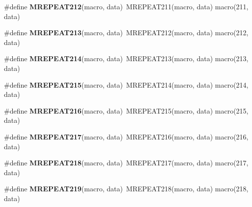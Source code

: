 \begin{DoxyCompactItemize}
\item 
\hypertarget{group__group__sam0__utils__mrepeat_gad82f46aaf9a5b824c91394754824d66d}{}\#define {\bfseries M\+R\+E\+P\+E\+A\+T212}(macro,  data)~M\+R\+E\+P\+E\+A\+T211(macro, data)   macro(211, data)\label{group__group__sam0__utils__mrepeat_gad82f46aaf9a5b824c91394754824d66d}

\item 
\hypertarget{group__group__sam0__utils__mrepeat_gaccb21a4853dfcaf0709211bfb7bd8671}{}\#define {\bfseries M\+R\+E\+P\+E\+A\+T213}(macro,  data)~M\+R\+E\+P\+E\+A\+T212(macro, data)   macro(212, data)\label{group__group__sam0__utils__mrepeat_gaccb21a4853dfcaf0709211bfb7bd8671}

\item 
\hypertarget{group__group__sam0__utils__mrepeat_ga7dc8e4f802d149970b11ab09ee582aca}{}\#define {\bfseries M\+R\+E\+P\+E\+A\+T214}(macro,  data)~M\+R\+E\+P\+E\+A\+T213(macro, data)   macro(213, data)\label{group__group__sam0__utils__mrepeat_ga7dc8e4f802d149970b11ab09ee582aca}

\item 
\hypertarget{group__group__sam0__utils__mrepeat_gae2a73793b6f0682b5b209181a2cce5c3}{}\#define {\bfseries M\+R\+E\+P\+E\+A\+T215}(macro,  data)~M\+R\+E\+P\+E\+A\+T214(macro, data)   macro(214, data)\label{group__group__sam0__utils__mrepeat_gae2a73793b6f0682b5b209181a2cce5c3}

\item 
\hypertarget{group__group__sam0__utils__mrepeat_gab9f89f1489a59ce0b2fdaf9c5a1eb04b}{}\#define {\bfseries M\+R\+E\+P\+E\+A\+T216}(macro,  data)~M\+R\+E\+P\+E\+A\+T215(macro, data)   macro(215, data)\label{group__group__sam0__utils__mrepeat_gab9f89f1489a59ce0b2fdaf9c5a1eb04b}

\item 
\hypertarget{group__group__sam0__utils__mrepeat_gac3e3763cfaa790bd77c54a125a5342ba}{}\#define {\bfseries M\+R\+E\+P\+E\+A\+T217}(macro,  data)~M\+R\+E\+P\+E\+A\+T216(macro, data)   macro(216, data)\label{group__group__sam0__utils__mrepeat_gac3e3763cfaa790bd77c54a125a5342ba}

\item 
\hypertarget{group__group__sam0__utils__mrepeat_ga35dba4e312bc00bcfcbf099981b01206}{}\#define {\bfseries M\+R\+E\+P\+E\+A\+T218}(macro,  data)~M\+R\+E\+P\+E\+A\+T217(macro, data)   macro(217, data)\label{group__group__sam0__utils__mrepeat_ga35dba4e312bc00bcfcbf099981b01206}

\item 
\hypertarget{group__group__sam0__utils__mrepeat_gad3ad7ca1333f24fd50e250e28d312509}{}\#define {\bfseries M\+R\+E\+P\+E\+A\+T219}(macro,  data)~M\+R\+E\+P\+E\+A\+T218(macro, data)   macro(218, data)\label{group__group__sam0__utils__mrepeat_gad3ad7ca1333f24fd50e250e28d312509}


\end{DoxyCompactItemize}
